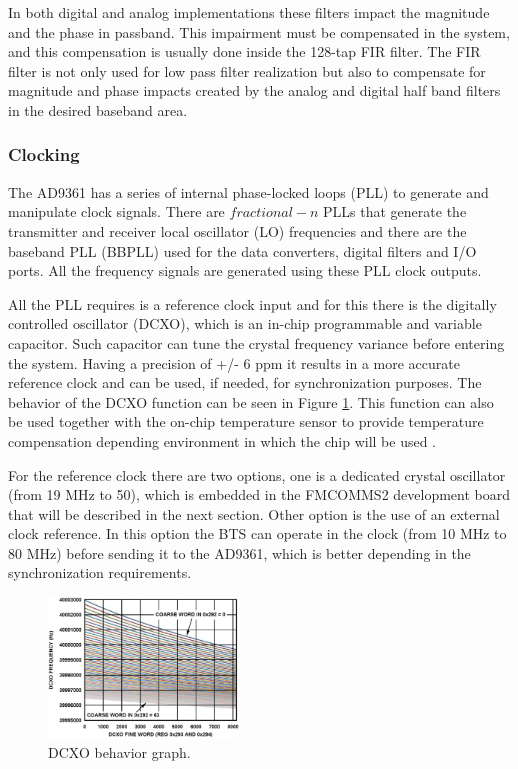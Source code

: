 In both digital and analog implementations these filters impact the magnitude
and the phase in passband. This impairment must be compensated in the system,
and this compensation is usually done inside the 128-tap FIR filter. The FIR
filter is not only used for low pass filter realization but also to compensate
for magnitude and phase impacts created by the analog and digital half band
filters in the desired baseband area.

\subsubsection{Clocking}

The AD9361 has a series of internal phase-locked loops (PLL) to generate and
manipulate clock signals. There are $fractional-n$ PLLs that generate the
transmitter and receiver local oscillator (LO) frequencies and there are the
baseband PLL (BBPLL) used for the data converters, digital filters and I/O
ports. All the frequency signals are generated using these PLL clock outputs.

All the PLL requires is a reference clock input and for this there is the
digitally controlled oscillator (DCXO), which is an in-chip programmable and
variable capacitor. Such capacitor can tune the crystal frequency variance
before entering the system. Having a precision of +/- 6 ppm it results in a more
accurate reference clock and can be used, if needed, for synchronization
purposes. The behavior of the DCXO function can be seen in Figure
\ref{fig:dcxo}. This function can also be used together with the on-chip
temperature sensor to provide temperature compensation depending environment in
which the chip will be used \cite{ad:ad9361}.

For the reference clock there are two options, one is a dedicated crystal
oscillator (from 19 MHz to 50), which is embedded in the FMCOMMS2 development
board that will be described in the next section. Other option is the use of an
external clock reference. In this option the BTS can operate in the clock (from
10 MHz to 80 MHz) before sending it to the AD9361, which is better depending in
the synchronization requirements.

\begin{figure}[htbp]
    \centering
    \includegraphics[width=0.45\textwidth]{./figures/dcxo_graph}
    \caption{ DCXO behavior graph.
    \label{fig:dcxo}}
\end{figure}


